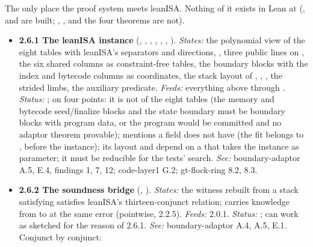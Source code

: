 The only place the proof system meets leanISA. Nothing of it exists in Lean at  (,  and  are built; , ,  and the four theorems are not).

\begin{itemize}[label={}, leftmargin=1.3em, itemindent=-1.3em, labelwidth=0pt, labelsep=0pt, itemsep=4pt, topsep=3pt]
\item {}\label{obl:node-2.6.1}\oblflag\textbf{2.6.1 The leanISA instance} (, , , , , , ). \emph{States:} the polynomial view of the eight tables with leanISA's separators and directions, , three public lines on , the six shared columns as constraint-free tables, the boundary blocks with the index and bytecode columns as  coordinates, the stack layout of , , , the strided limbs, the auxiliary predicate. \emph{Feeds:} everything above through . \emph{Status:}  ;  on four points: it is not  of the eight tables (the memory and bytecode seed/finalize blocks and the state boundary must be boundary blocks with  program data, or the program would be committed and no adaptor theorem provable);  mentions a field  does not have (the fit belongs to , before the instance); its layout and  depend on a  that takes the instance as parameter; it must be reducible for the tests'  search. \emph{See:} boundary-adaptor A.5, E.4, findings 1, 7, 12; code-layer1 G.2; gt-flock-ring 8.2, 8.3.
\item {}\label{obl:node-2.6.2}\textbf{2.6.2 The soundness bridge} (, ). \emph{States:} the witness rebuilt from a stack satisfying  satisfies leanISA's thirteen-conjunct relation; carries knowledge from  to  at the same error (pointwise, 2.2.5). \emph{Feeds:} 2.0.1. \emph{Status:} ; can work as sketched for the reason of 2.6.1. \emph{See:} boundary-adaptor A.4, A.5, E.1. Conjunct by conjunct:

\end{itemize}
